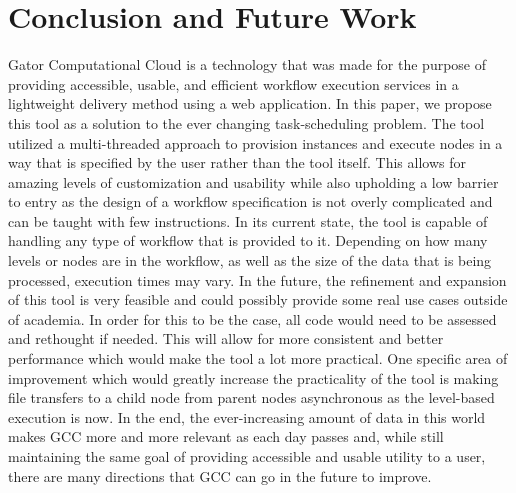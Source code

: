 \documentclass[fleqn,10pt]{SelfArx} %
\begin{document}

\section{Conclusion and Future Work}
\label{sec:conclusion}

Gator Computational Cloud is a technology that was made for the purpose of providing accessible, usable, and efficient workflow execution services in a lightweight delivery method using a web application. In this paper, we propose this tool as a solution to the ever changing task-scheduling problem. The tool utilized a multi-threaded approach to provision instances and execute nodes in a way that is specified by the user rather than the tool itself. This allows for amazing levels of customization and usability while also upholding a low barrier to entry as the design of a workflow specification is not overly complicated and can be taught with few instructions. In its current state, the tool is capable of handling any type of workflow that is provided to it. Depending on how many levels or nodes are in the workflow, as well as the size of the data that is being processed, execution times may vary. In the future, the refinement and expansion of this tool is very feasible and could possibly provide some real use cases outside of academia. In order for this to be the case, all code would need to be assessed and rethought if needed. This will allow for more consistent and better performance which would make the tool a lot more practical. One specific area of improvement which would greatly increase the practicality of the tool is making file transfers to a child node from parent nodes asynchronous as the level-based execution is now. In the end, the ever-increasing amount of data in this world makes GCC more and more relevant as each day passes and, while still maintaining the same goal of providing accessible and usable utility to a user, there are many directions that GCC can go in the future to improve.





\end{document}
